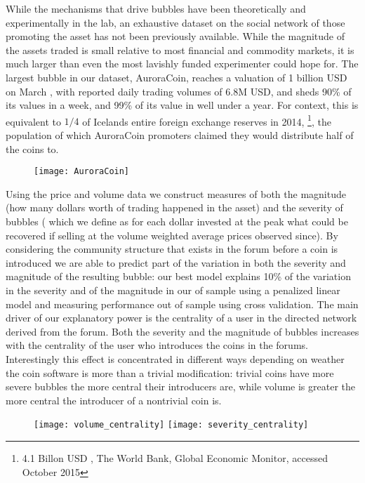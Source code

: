 While the mechanisms that drive bubbles have been theoretically  \cite{abolafia1988enacting, earl2007decision, bakker2010social, harras2011grow} and experimentally \cite{moinas2013bubble} in the lab, an exhaustive dataset on the social network of those promoting the asset has not been previously available.
While the magnitude of the assets traded is small relative to most financial and commodity markets, it is much larger than even the most lavishly funded experimenter could hope for.
The largest bubble in our dataset, AuroraCoin, reaches a valuation of 1 billion USD on March , with reported daily trading volumes of 6.8M USD, and sheds 90\% of its values in a week, and 99\% of its value in well under a year.
For context, this is equivalent to $1/4$ of Icelands entire foreign exchange reserves in 2014, \footnote{4.1 Billon USD , The World Bank, Global Economic Monitor, accessed October 2015}, the population of which AuroraCoin promoters claimed they would distribute half of the coins to.

\begin{figure}
\texttt{[image: AuroraCoin]}
\end{figure}

Using the price and volume data we construct measures of both  the magnitude (how many dollars worth of trading happened in the asset) and the severity of bubbles ( which we define as for each dollar invested at the peak what could be recovered if selling at the volume weighted average prices observed since).
By considering the community structure that exists in the forum before a coin is introduced we are able to predict part of the variation in both the severity and magnitude of the resulting bubble: our best model explains 10\% of the variation in the severity and of the magnitude in our of sample using a penalized linear model and measuring performance out of sample using cross validation. 
The main driver of our explanatory power is the centrality of a user in the directed network derived from the forum.
Both the severity and the magnitude of bubbles increases with the centrality of the user who introduces the coins in the forums.
Interestingly this effect is concentrated in different ways depending on weather the coin software is more than a trivial modification: trivial coins have more severe bubbles the more central their introducers are, while volume is greater the more central the introducer of a nontrivial coin is.


\begin{figure}
\texttt{[image: volume\_centrality]}
\texttt{[image: severity\_centrality]}
\end{figure}


